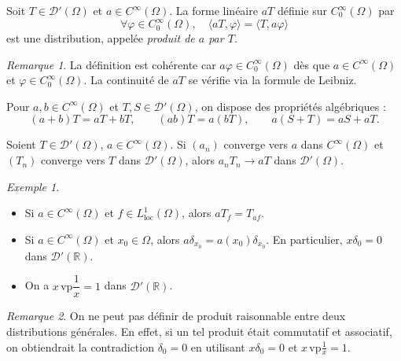 \documentclass[12pt,a4paper,openany]{book}
\theoremstyle{definition}
\theoremstyle{plain}
\theoremstyle{remark}
\newtheorem*{remark}{Remarque}
\newtheorem*{example}{Exemple}
\newenvironment{remarque}{\begin{remark}}{\end{remark}}
\newenvironment{exemple}{\begin{example}}{\end{example}}
\begin{document}
	\begin{definition}
		Soit $T \in \mathcal{D}'(\Omega)$ et $a \in C^\infty(\Omega)$. La forme linéaire $aT$ définie sur $C_0^\infty(\Omega)$ par
		\[
		\forall \varphi \in C_0^\infty(\Omega), \quad \langle aT, \varphi \rangle = \langle T, a\varphi \rangle
		\]
		est une distribution, appelée \emph{produit de $a$ par $T$}.
	\end{definition}
	
	\begin{remarque}
		La définition est cohérente car $a\varphi \in C_0^\infty(\Omega)$ dès que $a \in C^\infty(\Omega)$ et $\varphi \in C_0^\infty(\Omega)$. La continuité de $aT$ se vérifie via la formule de Leibniz.
	\end{remarque}
	
	Pour $a, b \in C^\infty(\Omega)$ et $T, S \in \mathcal{D}'(\Omega)$, on dispose des propriétés algébriques :
	\[
	(a+b)T = aT + bT, \qquad (ab)T = a(bT), \qquad a(S+T) = aS + aT.
	\]
	
	\begin{proposition}
		Soient $T \in \mathcal{D}'(\Omega)$, $a \in C^\infty(\Omega)$. Si $(a_n)$ converge vers $a$ dans $C^\infty(\Omega)$ et $(T_n)$ converge vers $T$ dans $\mathcal{D}'(\Omega)$, alors $a_n T_n \to aT$ dans $\mathcal{D}'(\Omega)$.
	\end{proposition}
	
	\begin{exemple}
		\begin{itemize}
			\item Si $a \in C^\infty(\Omega)$ et $f \in L^1_{\mathrm{loc}}(\Omega)$, alors $a T_f = T_{af}$.
			\item Si $a \in C^\infty(\Omega)$ et $x_0 \in \Omega$, alors $a\delta_{x_0} = a(x_0)\delta_{x_0}$. En particulier, $x\delta_0 = 0$ dans $\mathcal{D}'(\mathbb{R})$.
			\item On a $x\,\mathrm{vp}\dfrac{1}{x} = 1$ dans $\mathcal{D}'(\mathbb{R})$.
		\end{itemize}
	\end{exemple}
	
	\begin{remarque}
		On ne peut pas définir de produit raisonnable entre deux distributions générales. En effet, si un tel produit était commutatif et associatif, on obtiendrait la contradiction $\delta_0 = 0$ en utilisant $x\delta_0 = 0$ et $x\,\mathrm{vp}\frac{1}{x}=1$.
	\end{remarque}
	
\end{document}
